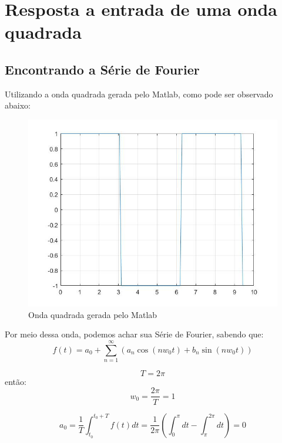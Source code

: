 \documentclass[a4paper,12pt,twoside]{article}
\begin{document}
\section{Resposta a entrada de uma onda quadrada}
\subsection{Encontrando a Série de Fourier}
Utilizando a onda quadrada gerada pelo Matlab, como pode ser observado abaixo:

\begin{figure}[H]
\centering
\includegraphics[scale=0.4]{squarewave.jpg}
\caption{Onda quadrada gerada pelo Matlab}
\label{fig:diagrama}
\end{figure}

Por meio dessa onda, podemos achar sua Série de Fourier, sabendo que:
\begin{equation}
f(t) = a_{0} +\sum_{n =1}^{\infty} (a_{n}\cos (nw_{0}t) +b_{n}\sin (nw_{0}t))
\end{equation}

\begin{equation}
    T= 2\pi
\end{equation}
 então:
\begin{equation}
    w_{0} = \frac{2\pi}{T} = 1 
\end{equation}

\begin{equation}
   a_{0} = \frac{1}{T}\int_{t_{0}}^{t_{0}+T}f(t)dt = \frac{1}{2\pi}(\int_{0}^{\pi}dt -\int_{\pi}^{2\pi}dt) = 0
\end{equation}
\end{document}
